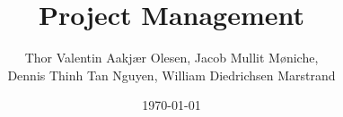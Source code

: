 \documentclass{article}
\date{\today}
\author{Thor Valentin Aakjær Olesen, Jacob Mullit Møniche,\\
 Dennis Thinh Tan Nguyen, William Diedrichsen Marstrand}
\title{Project Management}
\begin{document}
\maketitle
\pagebreak



\end{document}
